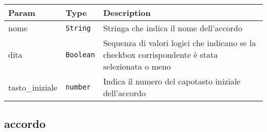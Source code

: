 \begin{tabularx}{\textwidth}{XXX}
\toprule
\begin{minipage}[b]{0.30\columnwidth}\raggedright
Param\strut
\end{minipage} & \begin{minipage}[b]{0.30\columnwidth}\raggedright
Type\strut
\end{minipage} & \begin{minipage}[b]{0.30\columnwidth}\raggedright
Description\strut
\end{minipage}\tabularnewline
\midrule
\endhead
\begin{minipage}[t]{0.30\columnwidth}\raggedright
nome\strut
\end{minipage} & \begin{minipage}[t]{0.30\columnwidth}\raggedright
\texttt{String}\strut
\end{minipage} & \begin{minipage}[t]{0.30\columnwidth}\raggedright
Stringa che indica il nome dell'accordo\strut
\end{minipage}\tabularnewline
\begin{minipage}[t]{0.30\columnwidth}\raggedright
dita\strut
\end{minipage} & \begin{minipage}[t]{0.30\columnwidth}\raggedright
\texttt{Boolean}\strut
\end{minipage} & \begin{minipage}[t]{0.30\columnwidth}\raggedright
Sequenza di valori logici che indicano se la checkbox corrispondente è
stata selezionata o meno\strut
\end{minipage}\tabularnewline
\begin{minipage}[t]{0.30\columnwidth}\raggedright
tasto\_iniziale\strut
\end{minipage} & \begin{minipage}[t]{0.30\columnwidth}\raggedright
\texttt{number}\strut
\end{minipage} & \begin{minipage}[t]{0.30\columnwidth}\raggedright
Indica il numero del capotasto iniziale dell'accordo\strut
\end{minipage}\tabularnewline
\bottomrule
\end{tabularx}

\protect\hypertarget{accordo}{}{}

\hypertarget{accordo-2}{%
\subsection{accordo}\label{accordo-2}}

